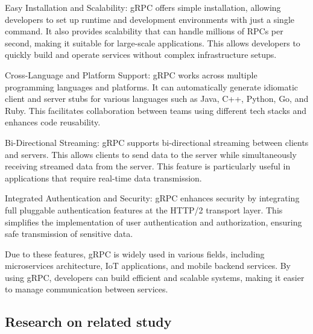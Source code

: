 \documentclass[conference]{IEEEtran}
\begin{document}
\begin{enumerate}[itemsep=2ex, parsep=1ex]
			Easy Installation and Scalability: gRPC offers simple installation,
			allowing developers to set up runtime and development environments with
			just a single command. It also provides scalability that can handle millions
			of RPCs per second, making it suitable for large-scale applications. This allows
			developers to quickly build and operate services without complex infrastructure
			setups.

			Cross-Language and Platform Support: gRPC works across multiple
			programming languages and platforms. It can automatically generate idiomatic
			client and server stubs for various languages such as Java, C++, Python,
			Go, and Ruby. This facilitates collaboration between teams using different
			tech stacks and enhances code reusability.

			Bi-Directional Streaming: gRPC supports bi-directional streaming between clients
			and servers. This allows clients to send data to the server while
			simultaneously receiving streamed data from the server. This feature is particularly
			useful in applications that require real-time data transmission.

			Integrated Authentication and Security: gRPC enhances security by
			integrating full pluggable authentication features at the HTTP/2 transport
			layer. This simplifies the implementation of user authentication and authorization,
			ensuring safe transmission of sensitive data.

			Due to these features, gRPC is widely used in various fields, including
			microservices architecture, IoT applications, and mobile backend services.
			By using gRPC, developers can build efficient and scalable systems, making
			it easier to manage communication between services.
	\end{enumerate}

	\subsection{Research on related study}
\end{document}
